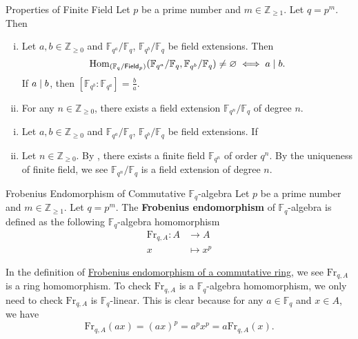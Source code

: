 \begin{proposition}{Properties of Finite Field}{}
    Let $p$ be a prime number and $m\in\mathbb{Z}_{\ge1}$. Let $q=p^m$. Then
    \begin{enumerate}[(i)]
        \item Let $a,b\in\mathbb{Z}_{\ge 0}$ and $\mathbb{F}_{q^a}/\mathbb{F}_{q}$, $\mathbb{F}_{q^b}/\mathbb{F}_{q}$ be field extensions. Then 
        \[
        \mathrm{Hom}_{(\mathbb{F}_{q}/\mathsf{Field}_p)}(\mathbb{F}_{q^a}/\mathbb{F}_{q},\mathbb{F}_{q^b}/\mathbb{F}_{q})\neq\varnothing\iff a\mid b.
        \]
        If $a\mid b$, then $\left[\mathbb{F}_{q^b}:\mathbb{F}_{q^a}\right]=\frac{b}{a}$.
        \item For any $n\in\mathbb{Z}_{\ge 0}$, there exists a field extension $\mathbb{F}_{q^n}/\mathbb{F}_q$ of degree $n$.
    \end{enumerate}
\end{proposition}
\begin{prf}
    \begin{enumerate}[(i)]
        \item Let $a,b\in\mathbb{Z}_{\ge 0}$ and $\mathbb{F}_{q^a}/\mathbb{F}_{q}$, $\mathbb{F}_{q^b}/\mathbb{F}_{q}$ be field extensions. If 
        \item Let $n\in\mathbb{Z}_{\ge 0}$. By , there exists a finite field $\mathbb{F}_{q^n}$ of order $q^n$. By the uniqueness of finite field, we see $\mathbb{F}_{q^n}/\mathbb{F}_q$ is a field extension of degree $n$.
    \end{enumerate}
\end{prf}


\begin{definition}{Frobenius Endomorphism of Commutative $\mathbb{F}_q$-algebra}{}
    Let $p$ be a prime number and $m\in\mathbb{Z}_{\ge1}$. Let $q=p^m$. The \textbf{Frobenius endomorphism} of $\mathbb{F}_q$-algebra is defined as the following $\mathbb{F}_q$-algebra homomorphism
    \begin{align*}
        \mathrm{Fr}_{q,A}:A&\longrightarrow A\\
        x&\longmapsto x^p
    \end{align*}
\end{definition}
\begin{remark}
    In the definition of \hyperref[th:frobenius_endomorphism_of_a_commutative_ring]{Frobenius endomorphism of a commutative ring}, we see $\mathrm{Fr}_{q,A}$ is a ring homomorphism. To check $\mathrm{Fr}_{q,A}$ is a $\mathbb{F}_q$-algebra homomorphism, we only need to check $\mathrm{Fr}_{q,A}$ is $\mathbb{F}_q$-linear. This is clear because for any $a\in\mathbb{F}_q$ and $x\in A$, we have
    \[
    \mathrm{Fr}_{q,A}(ax)=(ax)^p=a^px^p=a\mathrm{Fr}_{q,A}(x).
    \]
\end{remark}

